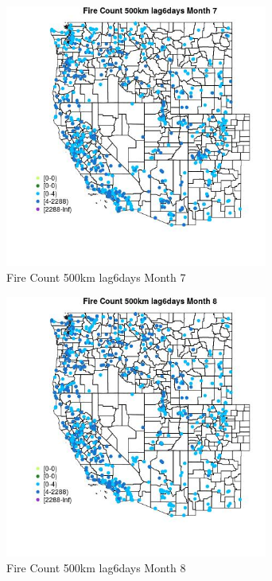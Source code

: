 \begin{figure} 
\centering  
\includegraphics[width=0.77\textwidth]{Code_Outputs/Report_ML_input_PM25_Step4_part_e_de_duplicated_aves_compiled_2019-05-21wNAs_MapObsMo7Fire_Count_500km_lag6days.jpg} 
\caption{\label{fig:Report_ML_input_PM25_Step4_part_e_de_duplicated_aves_compiled_2019-05-21wNAsMapObsMo7Fire_Count_500km_lag6days}Fire Count 500km lag6days Month 7} 
\end{figure} 
 

\begin{figure} 
\centering  
\includegraphics[width=0.77\textwidth]{Code_Outputs/Report_ML_input_PM25_Step4_part_e_de_duplicated_aves_compiled_2019-05-21wNAs_MapObsMo8Fire_Count_500km_lag6days.jpg} 
\caption{\label{fig:Report_ML_input_PM25_Step4_part_e_de_duplicated_aves_compiled_2019-05-21wNAsMapObsMo8Fire_Count_500km_lag6days}Fire Count 500km lag6days Month 8} 
\end{figure} 
 

